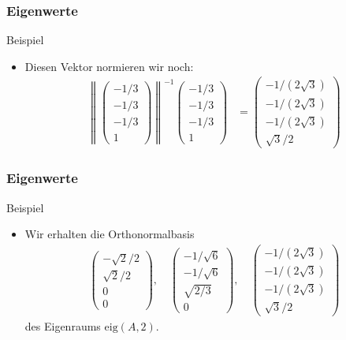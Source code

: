 \documentclass{beamer}
\newcommand\norm[1]{\left\|{#1}\right\|}
\newcommand{\eig}{\mathrm{eig}}
\newcommand{\mytitle}{Eigenwerte}
\begin{document}
\begin{frame}\frametitle{\mytitle}
	\begin{block}{Beispiel}
	\begin{itemize}
		\item Diesen Vektor normieren wir noch:
			\begin{align*}
				\norm{\begin{pmatrix}-1/3\\-1/3\\-1/3\\1 \end{pmatrix}}^{-1}\begin{pmatrix}-1/3\\-1/3\\-1/3\\1 \end{pmatrix}&=\begin{pmatrix}
				-1/(2\sqrt 3)\\-1/(2\sqrt 3)\\-1/(2\sqrt 3)\\\sqrt 3/2
				\end{pmatrix}
			\end{align*}
	\end{itemize}
	\end{block}
\end{frame}

\begin{frame}\frametitle{\mytitle}
	\begin{block}{Beispiel}
	\begin{itemize}
		\item Wir erhalten die Orthonormalbasis
			\begin{align*}
				\begin{pmatrix} -\sqrt 2/2\\\sqrt 2/2\\0\\0 \end{pmatrix},\quad
\begin{pmatrix}-1/\sqrt 6\\-1/\sqrt 6\\\sqrt{2/3}\\0\end{pmatrix},\quad
\begin{pmatrix} -1/(2\sqrt 3)\\-1/(2\sqrt 3)\\-1/(2\sqrt 3)\\\sqrt 3/2 \end{pmatrix}
			\end{align*}
			des Eigenraums $\eig(A,2)$.
	\end{itemize}
	\end{block}
\end{frame}
\end{document}
